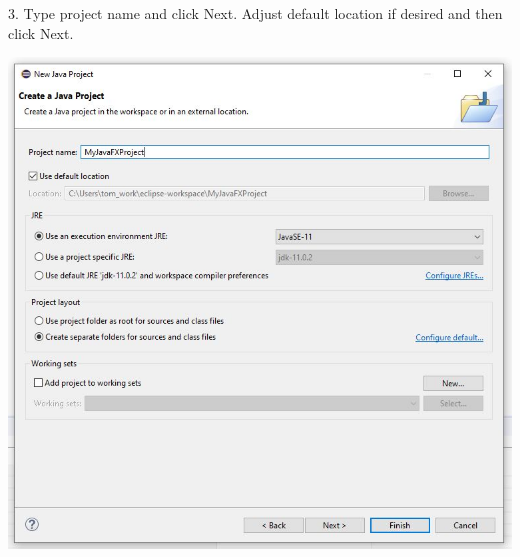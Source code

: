 \documentclass{beamer}
\begin{document}
\begin{frame}

        3.  Type project name and click Next.  Adjust default location if desired and then click Next.

        \begin{center}
            \includegraphics[scale=.35]{my_java_fx_project.jpg}
        \end{center}
        
\end{frame}
\end{document}

